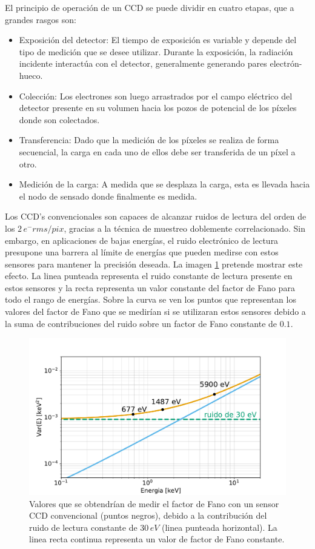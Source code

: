 \indent El principio de operación de un CCD se puede dividir en cuatro etapas, que a grandes rasgos son:
\begin{itemize}
    \item Exposición del detector: El tiempo de exposición es variable y depende del tipo de medición que se desee utilizar. Durante la exposición, la radiación incidente interactúa con el detector, generalmente generando pares electrón-hueco. 
    \item Colección: Los electrones son luego arrastrados por el campo eléctrico del detector presente en su volumen hacia los pozos de potencial de los píxeles donde son colectados.
    \item Transferencia: Dado que la medición de los píxeles se realiza de forma secuencial, la carga en cada uno de ellos debe ser transferida de un píxel a otro.
    \item Medición de la carga: A medida que se desplaza la carga, esta es llevada hacia el nodo de sensado donde finalmente es medida.
\end{itemize}
Los CCD's convencionales son capaces de alcanzar ruidos de lectura del orden de los $2\,e^{-}\si{rms/pix}$, gracias a la técnica de muestreo doblemente correlacionado\cite{Tiffenberg}. Sin embargo, en aplicaciones de bajas energías, el ruido electrónico de lectura presupone una barrera al límite de energías que pueden medirse con estos sensores para mantener la precisión deseada. La imagen \ref{fig:Fano_y_ruido} pretende mostrar este efecto. La linea punteada representa el ruido constante de lectura presente en estos sensores y la recta representa un valor constante del factor de Fano para todo el rango de energías. Sobre la curva se ven los puntos que representan los valores del factor de Fano que se medirían si se utilizaran estos sensores debido a la suma de contribuciones del ruido sobre un factor de Fano constante de $0.1$.
\begin{figure}[H]
    \centering
        \includegraphics[scale=.5]{Figs/fano_y_ruido.pdf}
    \caption{\footnotesize{Valores que se obtendrían de medir el factor de Fano con un sensor CCD convencional (puntos negros), debido a la contribución del ruido de lectura constante de $30\,\si{eV}$ (linea punteada horizontal). La linea recta continua representa un valor de factor de Fano constante.}}
    \label{fig:Fano_y_ruido}
\end{figure}
